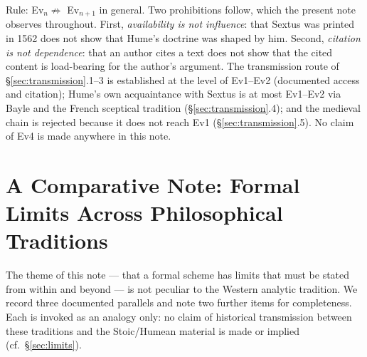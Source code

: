 \documentclass[11pt]{article}
\theoremstyle{plain}
\theoremstyle{definition}
\theoremstyle{remark}
\begin{document}
Rule: Ev$_n \not\Rightarrow$ Ev$_{n+1}$ in general. Two prohibitions
follow, which the present note observes throughout. First,
\emph{availability is not influence}: that Sextus was printed in 1562
does not show that Hume's doctrine was shaped by him. Second,
\emph{citation is not dependence}: that an author cites a text does
not show that the cited content is load-bearing for the author's
argument. The transmission route of \S\ref{sec:transmission}.1--3 is
established at the level of Ev1--Ev2 (documented access and
citation); Hume's own acquaintance with Sextus is at most Ev1--Ev2 via
Bayle and the French sceptical tradition
(\S\ref{sec:transmission}.4); and the medieval chain is rejected
because it does not reach Ev1 (\S\ref{sec:transmission}.5). No claim
of Ev4 is made anywhere in this note.

\section{A Comparative Note: Formal Limits Across Philosophical
Traditions}
\label{sec:comparative}

The theme of this note --- that a formal scheme has limits that must be
stated from within and beyond --- is not peculiar to the Western
analytic tradition. We record three documented parallels and note two
further items for completeness. Each is invoked as an analogy only: no
claim of historical transmission between these traditions and the
Stoic/Humean material is made or implied (cf.\ \S\ref{sec:limits}).
\end{document}
